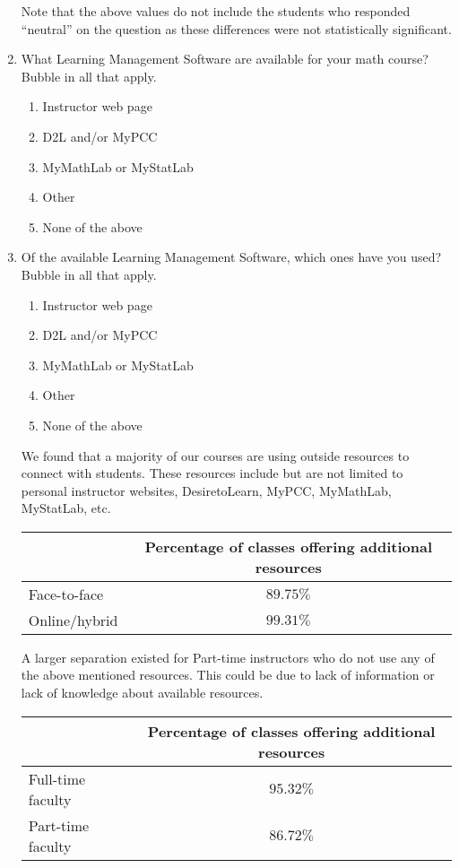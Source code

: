 \begin{enumerate}
	Note that the above values do not include the students who responded “neutral” on the question as these differences were not statistically significant. 
	\item What Learning Management Software are available for your math course? Bubble in all that apply.
	\begin{enumerate}
		\item  Instructor web page
		\item  D2L and/or MyPCC
		\item  MyMathLab or MyStatLab
		\item  Other
		\item  None of the above
	\end{enumerate}
	\item Of the available Learning Management Software, which ones have you used? Bubble in all that apply.
	\begin{enumerate}
		\item  Instructor web page
		\item   D2L and/or MyPCC
		\item   MyMathLab or MyStatLab
		\item   Other
		\item   None of the above
	\end{enumerate}
	We found that a majority of our courses are using outside resources to connect with students. These resources include but are not limited to personal instructor websites, DesiretoLearn, MyPCC, MyMathLab, MyStatLab, etc. 
	
	\begin{tabular}{lc}
		\toprule
		              & Percentage of classes offering additional resources \\
		\midrule
		Face-to-face  & $89.75\%$                                           \\
		Online/hybrid & $99.31\%$                                           \\
		\bottomrule
	\end{tabular}
	
	A larger separation existed for Part-time instructors who do not use any of the above mentioned resources. This could be due to lack of information or lack of knowledge about available resources.
	
	\begin{tabular}{lc}
		\toprule
		                  & Percentage of classes offering additional resources \\
		\midrule
		Full-time faculty & $95.32\%$                                           \\
		Part-time faculty & $86.72\%$                                           \\
		\bottomrule
	\end{tabular}
	

\end{enumerate}
